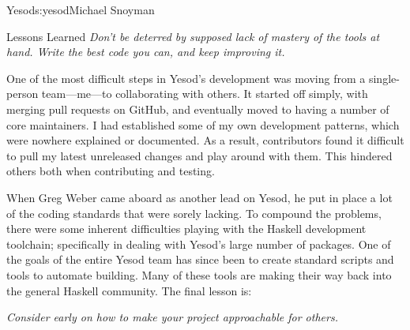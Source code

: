 \begin{aosachapter}{Yesod}{s:yesod}{Michael Snoyman}
\begin{aosasect1}{Lessons Learned}
\emph{Don't be deterred by supposed lack of mastery of the tools
  at hand. Write the best code you can, and keep improving it.}

One of the most difficult steps in Yesod's development was moving from
a single-person team---me---to collaborating with others. It started
off simply, with merging pull requests on GitHub, and eventually moved
to having a number of core maintainers. I had established some of my
own development patterns, which were nowhere explained or
documented. As a result, contributors found it difficult to pull my
latest unreleased changes and play around with them. This hindered
others both when contributing and testing.

When Greg Weber came aboard as another lead on Yesod, he put in place
a lot of the coding standards that were sorely lacking. To compound
the problems, there were some inherent difficulties playing with the
Haskell development toolchain; specifically in dealing with Yesod's large
number of packages. One of the goals of the entire Yesod team has
since been to create standard scripts and tools to automate
building. Many of these tools are making their way back into the
general Haskell community. The final lesson is:

\emph{Consider early on how to make your project approachable for
  others.}

\end{aosasect1}
\end{aosachapter}
